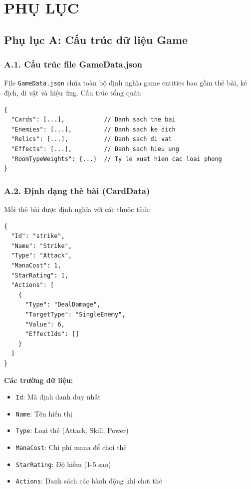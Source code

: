 \clearpage
{}
\chapter*{PHỤ LỤC}

\section*{Phụ lục A: Cấu trúc dữ liệu Game}

\subsection*{A.1. Cấu trúc file GameData.json}
File \texttt{GameData.json} chứa toàn bộ định nghĩa game entities bao gồm thẻ bài, kẻ địch, di vật và hiệu ứng. Cấu trúc tổng quát:

\begin{verbatim}
{
  "Cards": [...],           // Danh sach the bai
  "Enemies": [...],         // Danh sach ke dich
  "Relics": [...],          // Danh sach di vat
  "Effects": [...],         // Danh sach hieu ung
  "RoomTypeWeights": {...}  // Ty le xuat hien cac loai phong
}
\end{verbatim}

\subsection*{A.2. Định dạng thẻ bài (CardData)}
Mỗi thẻ bài được định nghĩa với các thuộc tính:

\begin{verbatim}
{
  "Id": "strike",
  "Name": "Strike",
  "Type": "Attack",
  "ManaCost": 1,
  "StarRating": 1,
  "Actions": [
    {
      "Type": "DealDamage",
      "TargetType": "SingleEnemy",
      "Value": 6,
      "EffectIds": []
    }
  ]
}
\end{verbatim}

\textbf{Các trường dữ liệu:}
\begin{itemize}
    \item \texttt{Id}: Mã định danh duy nhất
    \item \texttt{Name}: Tên hiển thị
    \item \texttt{Type}: Loại thẻ (Attack, Skill, Power)
    \item \texttt{ManaCost}: Chi phí mana để chơi thẻ
    \item \texttt{StarRating}: Độ hiếm (1-5 sao)
    \item \texttt{Actions}: Danh sách các hành động khi chơi thẻ
\end{itemize}

